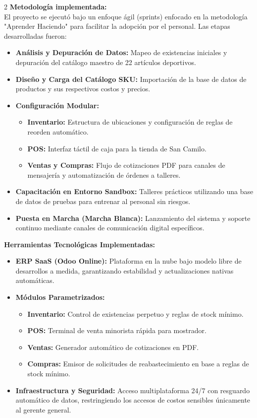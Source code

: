 \documentclass[12pt]{article}
\begin{document}
\begin{multicols}{2}
\textbf{Metodología implementada:}\\
El proyecto se ejecutó bajo un enfoque ágil (sprints) enfocado en la metodología "Aprender Haciendo" para facilitar la adopción por el personal. Las etapas desarrolladas fueron:
\begin{itemize}
    \item \textbf{Análisis y Depuración de Datos:} Mapeo de existencias iniciales y depuración del catálogo maestro de 22 artículos deportivos.
    \item \textbf{Diseño y Carga del Catálogo SKU:} Importación de la base de datos de productos y sus respectivos costos y precios.
    \item \textbf{Configuración Modular:}
    \begin{itemize}
        \item \textbf{Inventario:} Estructura de ubicaciones y configuración de reglas de reorden automático.
        \item \textbf{POS:} Interfaz táctil de caja para la tienda de San Camilo.
        \item \textbf{Ventas y Compras:} Flujo de cotizaciones PDF para canales de mensajería y automatización de órdenes a talleres.
    \end{itemize}
    \item \textbf{Capacitación en Entorno Sandbox:} Talleres prácticos utilizando una base de datos de pruebas para entrenar al personal sin riesgos.
    \item \textbf{Puesta en Marcha (Marcha Blanca):} Lanzamiento del sistema y soporte continuo mediante canales de comunicación digital específicos.
\end{itemize}

\textbf{Herramientas Tecnológicas Implementadas:}
\begin{itemize}
    \item \textbf{ERP SaaS (Odoo Online):} Plataforma en la nube bajo modelo libre de desarrollos a medida, garantizando estabilidad y actualizaciones nativas automáticas.
    \item \textbf{Módulos Parametrizados:}
    \begin{itemize}
        \item \textbf{Inventario:} Control de existencias perpetuo y reglas de stock mínimo.
        \item \textbf{POS:} Terminal de venta minorista rápida para mostrador.
        \item \textbf{Ventas:} Generador automático de cotizaciones en PDF.
        \item \textbf{Compras:} Emisor de solicitudes de reabastecimiento en base a reglas de stock mínimo.
    \end{itemize}
    \item \textbf{Infraestructura y Seguridad:} Acceso multiplataforma 24/7 con resguardo automático de datos, restringiendo los accesos de costos sensibles únicamente al gerente general.
\end{itemize}


\end{multicols}
\end{document}
